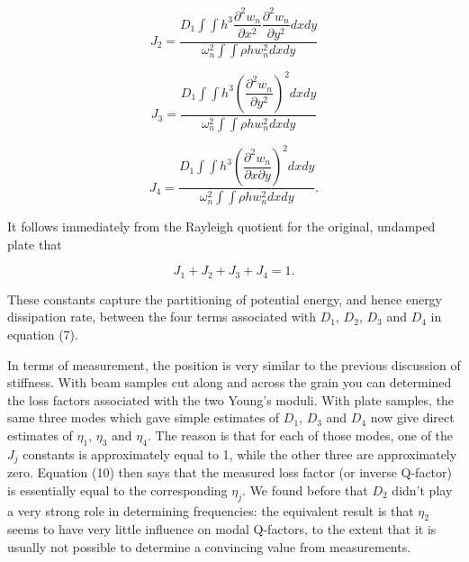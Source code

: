   \begin{equation*}J_2 = \dfrac{D_1 \int{\int{h^3 \dfrac{\partial^2 
  w_n}{\partial x^2} \dfrac{\partial^2 w_n}{\partial y^2} dx dy }}}{\omega_n^2 
  \int{ \int{ \rho h w_n^2 dx dy }}} \tag{12}\end{equation*} 

  \begin{equation*}J_3 = \dfrac{D_1 \int{\int{h^3 \left(\dfrac{\partial^2 
  w_n}{\partial y^2} \right)^2 dx dy }}}{\omega_n^2 \int{ \int{ \rho h w_n^2 dx 
  dy }}} \tag{13}\end{equation*} 

  \begin{equation*}J_4 = \dfrac{D_1 \int{\int{h^3 \left(\dfrac{\partial^2 
  w_n}{\partial x \partial y} \right)^2 dx dy }}}{\omega_n^2 \int{ \int{ \rho h 
  w_n^2 dx dy }}} . \tag{14}\end{equation*} 

  It follows immediately from the Rayleigh quotient for the original, undamped 
  plate that 

  \begin{equation*}J_1 + J_2 + J_3 + J_4 = 1 . \tag{15}\end{equation*} 

  These constants capture the partitioning of potential energy, and hence 
  energy dissipation rate, between the four terms associated with $D_1$, $D_2$, 
  $D_3$ and $D_4$ in equation (7). 

  In terms of measurement, the position is very similar to the previous 
  discussion of stiffness. With beam samples cut along and across the grain you 
  can determined the loss factors associated with the two Young's moduli. With 
  plate samples, the same three modes which gave simple estimates of $D_1$, 
  $D_3$ and $D_4$ now give direct estimates of $\eta_1$, $\eta_3$ and $\eta_4$. 
  The reason is that for each of those modes, one of the $J_j$ constants is 
  approximately equal to 1, while the other three are approximately zero. 
  Equation (10) then says that the measured loss factor (or inverse Q-factor) 
  is essentially equal to the corresponding $\eta_j$. We found before that 
  $D_2$ didn't play a very strong role in determining frequencies: the 
  equivalent result is that $\eta_2$ seems to have very little influence on 
  modal Q-factors, to the extent that it is usually not possible to determine a 
  convincing value from measurements. 

